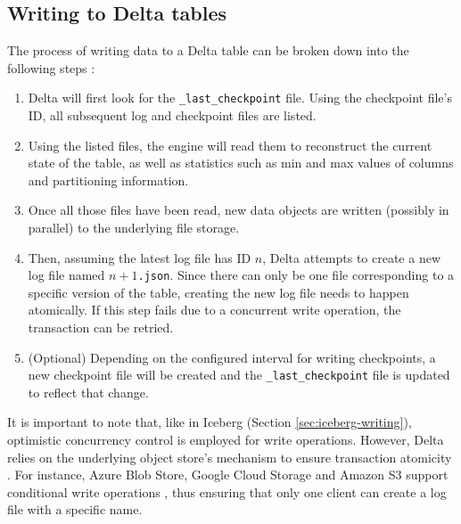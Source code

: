 
\subsection{Writing to Delta tables}
The process of writing data to a Delta table can be broken down into the following steps \cite{armbrust_delta_2020}:

\begin{enumerate}
    \item Delta will first look for the \verb|_last_checkpoint| file. Using the checkpoint file's ID, all subsequent log and checkpoint files are listed.

    \item Using the listed files, the engine will read them to reconstruct the current state of the table, as well as statistics such as min and max values of columns and partitioning information.

    \item Once all those files have been read, new data objects are written (possibly in parallel) to the underlying file storage.

    \item Then, assuming the latest log file has ID $n$, Delta attempts to create a new log file named $n+1$\verb|.json|. Since there can only be one file corresponding to a specific version of the table, creating the new log file needs to happen atomically. If this step fails due to a concurrent write operation, the transaction can be retried.

    \item (Optional) Depending on the configured interval for writing checkpoints, a new checkpoint file will be created and the \verb|_last_checkpoint| file is updated to reflect that change.
\end{enumerate}

It is important to note that, like in Iceberg (Section \ref{sec:iceberg-writing}), optimistic concurrency control is employed for write operations. However, Delta relies on the underlying object store's mechanism to ensure transaction atomicity \cite{armbrust_delta_2020}. For instance, Azure Blob Store, Google Cloud Storage and Amazon S3 support conditional write operations \cite{SpecifyingConditionalHeaders2025, RequestPreconditions2026, HowPreventObject}, thus ensuring that only one client can create a log file with a specific name.

